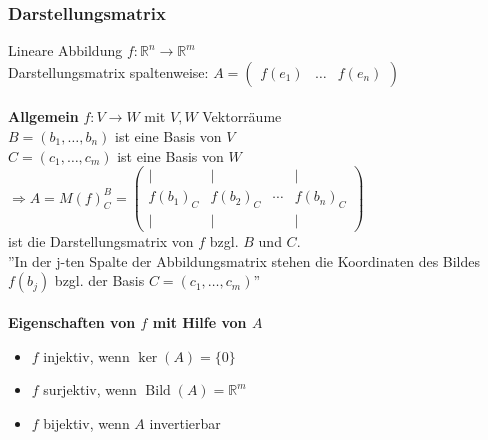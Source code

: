 \documentclass[6pt,a4paper]{scrartcl}
\DeclareMathOperator{\Bild}{Bild}
\begin{document}
\begin{multicols*}{4}
\subsubsection{Darstellungsmatrix}
Lineare Abbildung $f:\mathbb{R}^n \rightarrow \mathbb{R}^m$ \\
Darstellungsmatrix spaltenweise:
$A=\begin{pmatrix}f(e_1) & \dots & f(e_n)
\end{pmatrix} $ \\ \\
\textbf{Allgemein} $f:V\rightarrow W$ mit $V, W$ Vektorräume \\
$B=(b_1,\dots,b_n)$ ist eine Basis von $V$ \\
$C=(c_1,\dots,c_m)$ ist eine Basis von $W$ \\
$\Rightarrow A=M(f)_C^B = \begin{pmatrix}
\vert & \vert &  & \vert \\
f(b_1)_C & f(b_2)_C & \cdots & f(b_n)_C\\
\vert & \vert &  & \vert
\end{pmatrix}$ \\
ist die Darstellungsmatrix von $f$ bzgl. $B$ und $C$. \\
''In der j-ten Spalte der Abbildungsmatrix stehen die Koordinaten des Bildes $f(b_j)$ bzgl. der Basis $C=(c_1,\dots,c_m)$'' \\ \\
\textbf{Eigenschaften von $f$ mit Hilfe von $A$}
\begin{itemize}\itemsep0pt
\item $f$ injektiv, wenn $\ker(A)=\{0\}$
\item $f$ surjektiv, wenn $\Bild(A)=\mathbb{R}^m$
\item $f$ bijektiv, wenn $A$ invertierbar
\end{itemize}

\end{multicols*}
\end{document}
